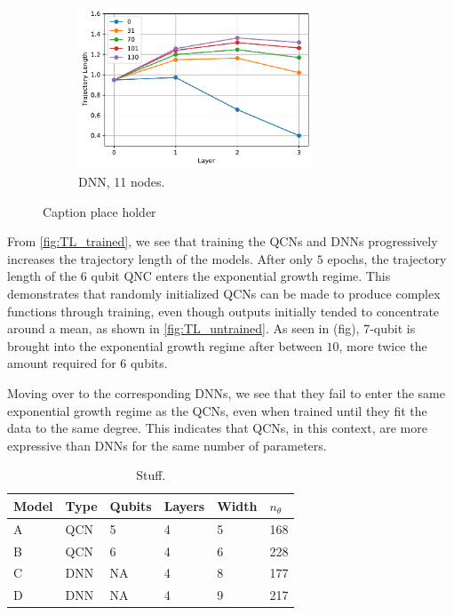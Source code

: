 \begin{figure}[H]
\begin{subfigure}[t]{0.5\textwidth}
    \end{subfigure}%
    \hfill 
    \begin{subfigure}[t]{0.5\textwidth}
        \centering
        \includegraphics[height=1.9in]{latex/figures/TL_trained_DNN_nodes_11}
        \caption{DNN, 11 nodes.}
    \end{subfigure}
    \caption{Caption place holder}
    \label{fig:TL_trained}
\end{figure}

From \autoref{fig:TL_trained}, we see that training the QCNs and DNNs progressively increases the trajectory length of the models. After only $5$ epochs, the trajectory length of the 6 qubit QNC enters the exponential growth regime. This demonstrates that randomly initialized QCNs can be made to produce complex functions through training, even though outputs initially tended to concentrate around a mean, as shown in \autoref{fig:TL_untrained}. As seen in (fig), 7-qubit is brought into the exponential growth regime after between $10$, more twice the amount required for 6 qubits. 

Moving over to the corresponding DNNs, we see that they fail to enter the same exponential growth regime as the QCNs, even when trained until they fit the data to the same degree. This indicates that QCNs, in this context, are more expressive than DNNs for the same number of parameters.  

\begin{table}[H]
\centering
\begin{tabular}{|l|l|l|l|l|l|}
\hline
Model &Type & Qubits& Layers & Width &$n_{\theta}$ \\ \hline
A    & QCN & 5 &  4 & 5& 168   \\ \hline
B    & QCN & 6 &  4 & 6& 228 \\ \hline
C    & DNN & NA&  4 & 8& 177  \\ \hline
D    & DNN & NA&  4 & 9& 217  \\ \hline
\end{tabular}
\caption{Stuff.} 
\label{tab:TL models}
\end{table}

